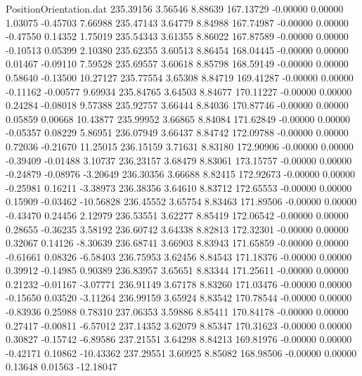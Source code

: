 \begin{filecontents}{PositionOrientation.dat}
 235.39156    3.56546    8.88639   167.13729   -0.00000    0.00000    1.03075   -0.45703    7.66988
 235.47143    3.64779    8.84988   167.74987   -0.00000    0.00000   -0.47550    0.14352    1.75019
 235.54343    3.61355    8.86022   167.87589   -0.00000    0.00000   -0.10513    0.05399    2.10380
 235.62355    3.60513    8.86454   168.04445   -0.00000    0.00000    0.01467   -0.09110    7.59528
 235.69557    3.60618    8.85798   168.59149   -0.00000    0.00000    0.58640   -0.13500   10.27127
 235.77554    3.65308    8.84719   169.41287   -0.00000    0.00000   -0.11162   -0.00577    9.69934
 235.84765    3.64503    8.84677   170.11227   -0.00000    0.00000    0.24284   -0.08018    9.57388
 235.92757    3.66444    8.84036   170.87746   -0.00000    0.00000    0.05859    0.00668   10.43877
 235.99952    3.66865    8.84084   171.62849   -0.00000    0.00000   -0.05357    0.08229    5.86951
 236.07949    3.66437    8.84742   172.09788   -0.00000    0.00000    0.72036   -0.21670   11.25015
 236.15159    3.71631    8.83180   172.90906   -0.00000    0.00000   -0.39409   -0.01488    3.10737
 236.23157    3.68479    8.83061   173.15757   -0.00000    0.00000   -0.24879   -0.08976   -3.20649
 236.30356    3.66688    8.82415   172.92673   -0.00000    0.00000   -0.25981    0.16211   -3.38973
 236.38356    3.64610    8.83712   172.65553   -0.00000    0.00000    0.15909   -0.03462  -10.56828
 236.45552    3.65754    8.83463   171.89506   -0.00000    0.00000   -0.43470    0.24456    2.12979
 236.53551    3.62277    8.85419   172.06542   -0.00000    0.00000    0.28655   -0.36235    3.58192
 236.60742    3.64338    8.82813   172.32301   -0.00000    0.00000    0.32067    0.14126   -8.30639
 236.68741    3.66903    8.83943   171.65859   -0.00000    0.00000   -0.61661    0.08326   -6.58403
 236.75953    3.62456    8.84543   171.18376   -0.00000    0.00000    0.39912   -0.14985    0.90389
 236.83957    3.65651    8.83344   171.25611   -0.00000    0.00000    0.21232   -0.01167   -3.07771
 236.91149    3.67178    8.83260   171.03476   -0.00000    0.00000   -0.15650    0.03520   -3.11264
 236.99159    3.65924    8.83542   170.78544   -0.00000    0.00000   -0.83936    0.25988    0.78310
 237.06353    3.59886    8.85411   170.84178   -0.00000    0.00000    0.27417   -0.00811   -6.57012
 237.14352    3.62079    8.85347   170.31623   -0.00000    0.00000    0.30827   -0.15742   -6.89586
 237.21551    3.64298    8.84213   169.81976   -0.00000    0.00000   -0.42171    0.10862  -10.43362
 237.29551    3.60925    8.85082   168.98506   -0.00000    0.00000    0.13648    0.01563  -12.18047

\end{filecontents}
